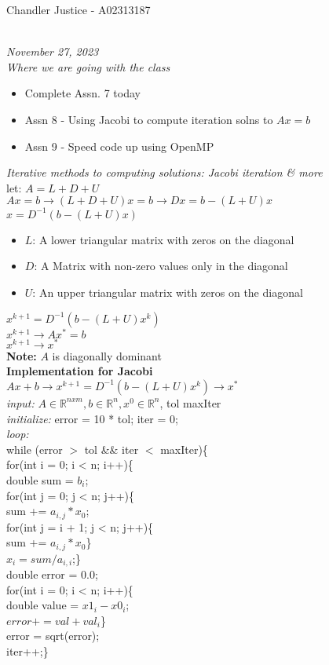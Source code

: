 \documentclass[10pt, AMS Euler]{article}
\newcommand{\R}{\mathbb{R}}
\begin{document}
\begin{flushright}
Chandler Justice - A02313187
\end{flushright}
\noindent \underline{\hspace{3in}}\\
\textit{November 27, 2023}\\
\textit{Where we are going with the class}
\begin{itemize}
  \item Complete Assn. 7 today
  \item Assn 8 - Using Jacobi to compute iteration solns to $Ax =b$
  \item Assn 9 - Speed code up using OpenMP
\end{itemize}
\textit{Iterative methods to computing solutions: Jacobi iteration \& more}\\
let: $A = L + D + U$\\
$Ax = b \rightarrow (L + D + U) x = b \rightarrow Dx = b - (L + U)x$\\
$x = D^{-1}(b- (L + U) x)$\\
\begin{itemize}
  \item $L$: A lower triangular matrix with zeros on the diagonal
  \item $D$: A Matrix with non-zero values only in the diagonal
  \item $U$: An upper triangular matrix with zeros on the diagonal
\end{itemize}
$x^{k+1} = D^{-1} (b - (L + U)x^k)$\\
$x^{k+1} \rightarrow Ax^* = b$\\
$x^{k+1} \rightarrow x^*$\\
\textbf{Note:} $A$ is diagonally dominant\\

\textbf{Implementation for Jacobi}\\
$Ax + b \rightarrow x^{k+1} = D^{-1}(b - (L + U)x^k) \rightarrow x^*$\\
\textit{input:} $A \in \R^{n x m}, b \in \R^n, x^0 \in \R^n$, tol maxIter\\
\textit{initialize:} error = 10 * tol; iter = 0;\\

\textit{loop:}\\
while (error $>$ tol \&\& iter $<$ maxIter)\{\\
for(int i = 0; i < n; i++)\{\\
double sum = $b_i$;\\
for(int j = 0; j < n; j++)\{\\
sum += $a_{i,j} * x_0$;\\
for(int j = i + 1; j < n; j++)\{\\
sum += $a_{i,j} * x_0$\}\\
$x_i = sum / a_{i,i}$;\}\\
double error = 0.0;\\
for(int i = 0; i < n; i++)\{\\
double value = $x1_i - x0_i$;\\
$error += val + val_i$\}\\
error = sqrt(error);\\
iter++;\}\\
\end{document}
